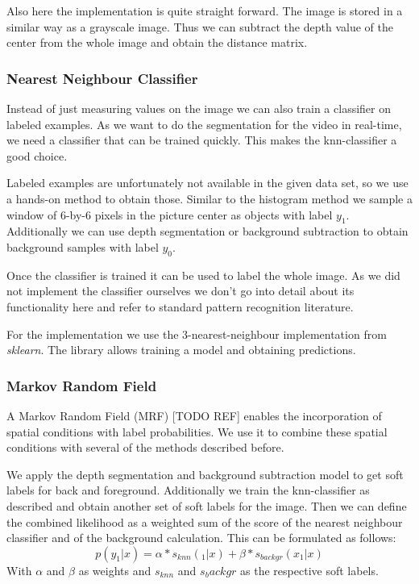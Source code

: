 \documentclass[letterpaper, 10 pt, conference]{ieeeconf}  %
\begin{document}
Also here the implementation is quite straight forward. The image is stored in a similar way as a grayscale image. Thus we can subtract the depth value of the center from the whole image and obtain the distance matrix. 

\subsubsection{Nearest Neighbour Classifier}

Instead of just measuring values on the image we can also train a classifier on labeled examples. As we want to do the segmentation for the video in real-time, we need a classifier that can be trained quickly. This makes the knn-classifier a good choice.

Labeled examples are unfortunately not available in the given data set, so we use a hands-on method to obtain those. Similar to the histogram method we sample a window of 6-by-6 pixels in the picture center as objects with label $y_1$. Additionally we can use depth segmentation or background subtraction to obtain background samples with label $y_0$. 

Once the classifier is trained it can be used to label the whole image. As we did not implement the classifier ourselves we don't go into detail about its functionality here and refer to standard pattern recognition literature.

For the implementation we use the 3-nearest-neighbour implementation from \textit{sklearn}. The library allows training a model and obtaining predictions.

\subsubsection{Markov Random Field}

A Markov Random Field (MRF) [TODO REF] enables the incorporation of spatial conditions with label probabilities. We use it to combine these spatial conditions with several of the methods described before.

We apply the depth segmentation and background subtraction model to get soft labels for back and foreground. Additionally we train the knn-classifier as described and obtain another set of soft labels for the image. Then we can define the combined likelihood as a weighted sum of the score of the nearest neighbour classifier and of the background calculation. This can be formulated as follows:
\begin{equation}
p(y_1 | x) = \alpha * s_{knn}(_1 | x) + \beta * s_{backgr}(x_1 | x) 
\end{equation}
With $\alpha$ and $\beta$ as weights and $s_{knn}$ and $s_backgr$ as the respective soft labels.
\end{document}
